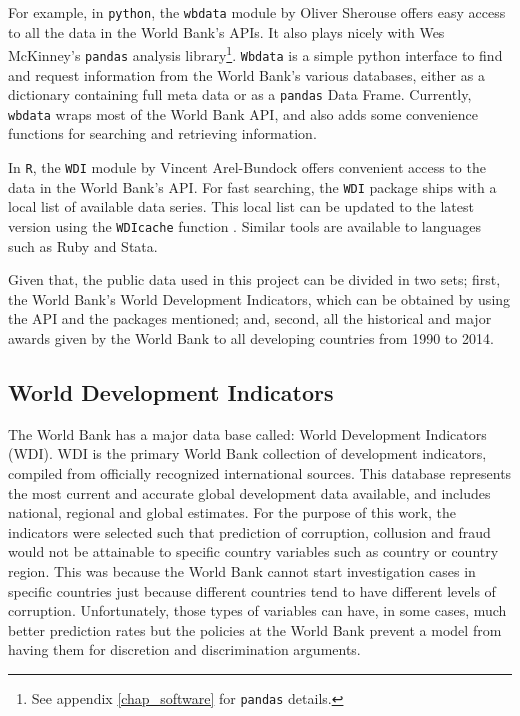 For example, in \texttt{python}, the \texttt{wbdata} module by Oliver Sherouse offers easy access to all the data in the World Bank's APIs. It also plays nicely with Wes McKinney’s  \texttt{pandas} analysis library\footnote{See appendix \ref{chap_software} for \texttt{pandas} details.}. \texttt{Wbdata} is a simple python interface to find and request information from the World Bank's various databases, either as a dictionary containing full meta data or as a \texttt{pandas} Data Frame. Currently, \texttt{wbdata} wraps most of the World Bank API, and also adds some convenience functions for searching and retrieving information.

In \texttt{R}, the \texttt{WDI} module by Vincent Arel-Bundock offers convenient access to the data in the World Bank's API. For fast searching, the \texttt{WDI} package ships with a local list of available data series. This local list can be updated to the latest version using the \texttt{WDIcache} function \parencite{wb_r}. Similar tools are available to languages such as Ruby and Stata.

Given that, the public data used in this project can be divided in two sets; first, the World Bank's World Development Indicators, which can be obtained by using the API and the packages mentioned; and, second, all the historical and major awards given by the World Bank to all developing countries from 1990 to 2014. 


\subsection{World Development Indicators}

The World Bank has a major data base called: World Development Indicators (WDI). WDI is the primary World Bank collection of development indicators, compiled from officially recognized international sources. This database represents the most current and accurate global development data available, and includes national, regional and global estimates. For the purpose of this work, the indicators were selected such that prediction of corruption, collusion and fraud would not be attainable to specific country variables such as country or country region. This was because the World Bank cannot start investigation cases in specific countries just because different countries tend to have different levels of corruption. Unfortunately, those types of variables can have, in some cases, much better prediction rates but the policies at the World Bank prevent a model from having them for discretion and discrimination arguments.

